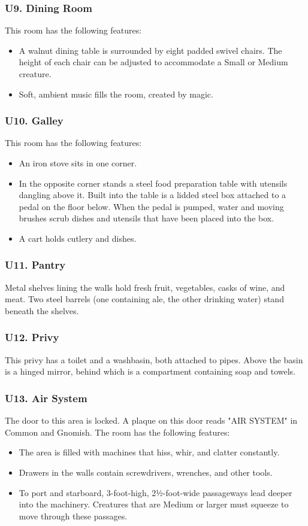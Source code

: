 \documentclass[10pt,a4paper,twoside,twocolumn,openany,nodeprecatedcode]{dndbook}
\begin{document}
\subsubsection{U9. Dining Room}
This room has the following features:
\begin{itemize}

\item A walnut dining table is surrounded by eight padded swivel chairs. The height of each chair can be adjusted to accommodate a Small or Medium creature.
\item Soft, ambient music fills the room, created by magic.
\end{itemize}


\subsubsection{U10. Galley}
This room has the following features:
\begin{itemize}

\item An iron stove sits in one corner.
\item In the opposite corner stands a steel food preparation table with utensils dangling above it. Built into the table is a lidded steel box attached to a pedal on the floor below. When the pedal is pumped, water and moving brushes scrub dishes and utensils that have been placed into the box.
\item A cart holds cutlery and dishes.
\end{itemize}


\subsubsection{U11. Pantry}
Metal shelves lining the walls hold fresh fruit, vegetables, casks of wine, and meat. Two steel barrels (one containing ale, the other drinking water) stand beneath the shelves.
\subsubsection{U12. Privy}
This privy has a toilet and a washbasin, both attached to pipes. Above the basin is a hinged mirror, behind which is a compartment containing soap and towels.
\subsubsection{U13. Air System}
The door to this area is locked. A plaque on this door reads "AIR SYSTEM" in Common and Gnomish. The room has the following features:
\begin{itemize}

\item The area is filled with machines that hiss, whir, and clatter constantly.
\item Drawers in the walls contain screwdrivers, wrenches, and other tools.
\item To port and starboard, 3-foot-high, 2½-foot-wide passageways lead deeper into the machinery. Creatures that are Medium or larger must squeeze to move through these passages.
\end{itemize}
\end{document}
